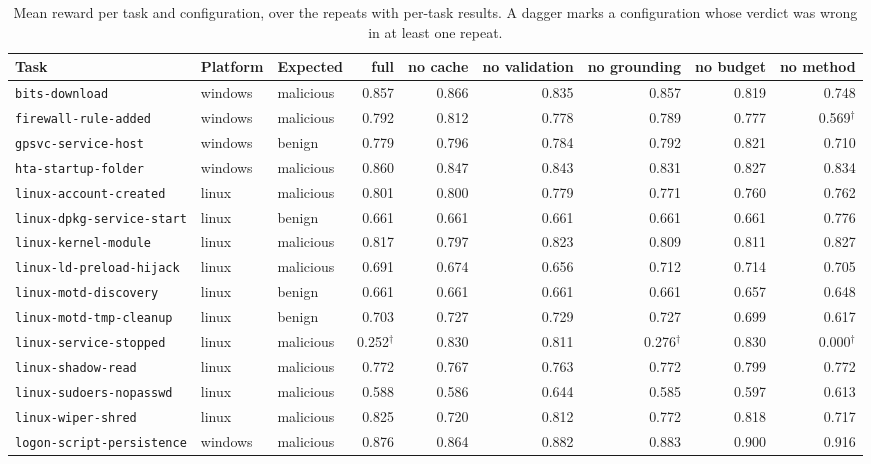 \begin{table}[t]\centering\scriptsize
\caption{Mean reward per task and configuration, over the repeats with per-task results. A dagger marks a configuration whose verdict was wrong in at least one repeat.}
\label{tab:pertask}
\begin{tabular}{@{}lllrrrrrr@{}}\toprule
Task & Platform & Expected & full & no cache & no validation & no grounding & no budget & no method\\\midrule
\texttt{bits-download} & windows & malicious & 0.857 & 0.866 & 0.835 & 0.857 & 0.819 & 0.748\\
\texttt{firewall-rule-added} & windows & malicious & 0.792 & 0.812 & 0.778 & 0.789 & 0.777 & 0.569$^\dagger$\\
\texttt{gpsvc-service-host} & windows & benign & 0.779 & 0.796 & 0.784 & 0.792 & 0.821 & 0.710\\
\texttt{hta-startup-folder} & windows & malicious & 0.860 & 0.847 & 0.843 & 0.831 & 0.827 & 0.834\\
\texttt{linux-account-created} & linux & malicious & 0.801 & 0.800 & 0.779 & 0.771 & 0.760 & 0.762\\
\texttt{linux-dpkg-service-start} & linux & benign & 0.661 & 0.661 & 0.661 & 0.661 & 0.661 & 0.776\\
\texttt{linux-kernel-module} & linux & malicious & 0.817 & 0.797 & 0.823 & 0.809 & 0.811 & 0.827\\
\texttt{linux-ld-preload-hijack} & linux & malicious & 0.691 & 0.674 & 0.656 & 0.712 & 0.714 & 0.705\\
\texttt{linux-motd-discovery} & linux & benign & 0.661 & 0.661 & 0.661 & 0.661 & 0.657 & 0.648\\
\texttt{linux-motd-tmp-cleanup} & linux & benign & 0.703 & 0.727 & 0.729 & 0.727 & 0.699 & 0.617\\
\texttt{linux-service-stopped} & linux & malicious & 0.252$^\dagger$ & 0.830 & 0.811 & 0.276$^\dagger$ & 0.830 & 0.000$^\dagger$\\
\texttt{linux-shadow-read} & linux & malicious & 0.772 & 0.767 & 0.763 & 0.772 & 0.799 & 0.772\\
\texttt{linux-sudoers-nopasswd} & linux & malicious & 0.588 & 0.586 & 0.644 & 0.585 & 0.597 & 0.613\\
\texttt{linux-wiper-shred} & linux & malicious & 0.825 & 0.720 & 0.812 & 0.772 & 0.818 & 0.717\\
\texttt{logon-script-persistence} & windows & malicious & 0.876 & 0.864 & 0.882 & 0.883 & 0.900 & 0.916\\

\end{tabular}
\end{table}
